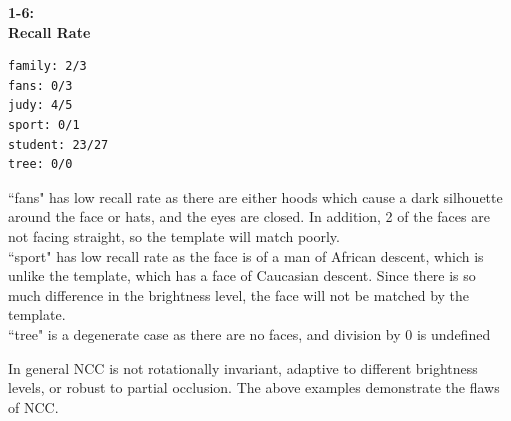 \documentclass[]{article}
\begin{document}
\textbf{1-6:}\\
\textbf{Recall Rate}
\begin{verbatim}
family: 2/3
fans: 0/3
judy: 4/5
sport: 0/1
student: 23/27
tree: 0/0
\end{verbatim}
``fans" has low recall rate as there are either hoods which cause a dark silhouette around the face or hats, and the eyes are closed. In addition, 2 of the faces are not facing straight, so the template will match poorly.\\

``sport" has low recall rate as the face is of a man of African descent, which is unlike the template, which has a
face of Caucasian descent. Since there is so much difference in the brightness level, the face will not be matched by the template.\\

``tree" is a degenerate case as there are no faces, and division by 0 is undefined

In general NCC is not rotationally invariant, adaptive to different brightness levels, or robust to partial occlusion. The above examples demonstrate the flaws of NCC.
\end{document}
